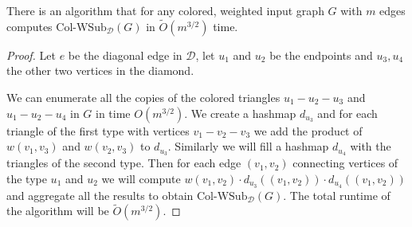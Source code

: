 \documentclass[a4paper,UKenglish,cleveref, autoref, numberwithinsect, thm-restate]{lipics-v2021}
\newcommand{\diamondgraph}{\cD}
\newcommand{\WSub}[2]{\mathrm{\text{Col-WSub}}_{#2}(#1)}
\newcommand{\cD}{\mathcal{D}}
\begin{document}
	\begin{lemma}
		There is an algorithm that for any colored, weighted input graph $G$ with $m$ edges computes $\WSub{G}{\diamondgraph}$ in $\tilde{O}(m^{3/2})$ time.
	\end{lemma}
	\begin{proof}
		Let $e$ be the diagonal edge in $\diamondgraph$, let $u_1$ and $u_2$ be the endpoints and $u_3,u_4$ the other two vertices in the diamond.
		
		We can enumerate all the copies of the colored triangles $u_1-u_2-u_3$ and $u_1-u_2-u_4$ in $G$ in time $O(m^{3/2})$. We create a hashmap $d_{u_3}$ and for each triangle of the first type with vertices $v_1-v_2-v_3$ we add the product of $w(v_1,v_3)$ and $w(v_2,v_3)$ to $d_{u_3}$. Similarly we will fill a hashmap $d_{u_4}$ with the triangles of the second type. Then for each edge $(v_1,v_2)$ connecting vertices of the type $u_1$ and $u_2$ we will compute $w(v_1,v_2) \cdot d_{u_3}((v_1,v_2)) \cdot d_{u_4}((v_1,v_2))$ and aggregate all the results to obtain $\WSub{G}{\diamondgraph}$. The total runtime of the algorithm will be $\tilde{O}(m^{3/2})$.
	\end{proof}
	
\end{document}
